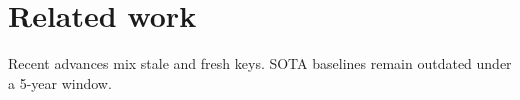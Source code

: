 \section{Related work}
Recent advances \cite{smith2015,lee2024} mix stale and fresh keys.
SOTA baselines \citep{jones2018} remain outdated under a 5-year window.
